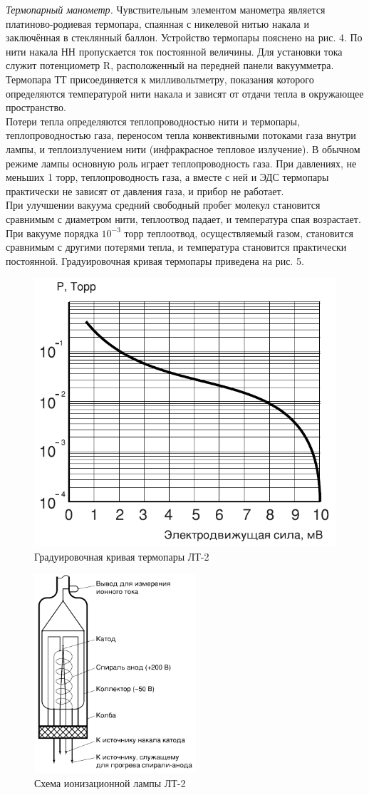 \documentclass[12pt,a4paper]{article}
\begin{document}
 \textit{Термопарный манометр.} Чувствительным элементом манометра является платиново-родиевая термопара, спаянная с никелевой нитью накала и заключённая в стеклянный баллон. Устройство термопары пояснено на рис. 4. По нити накала НН пропускается ток постоянной величины. Для установки тока служит потенциометр R, расположенный на передней панели вакуумметра. Термопара ТТ присоединяется к милливольтметру, показания которого определяются температурой нити накала и зависят от отдачи тепла в окружающее пространство. \\
 Потери тепла определяются теплопроводностью нити и термопары, теплопроводностью газа, переносом тепла конвективными потоками газа внутри лампы, и теплоизлучением нити (инфракрасное тепловое излучение). В обычном режиме лампы основную роль играет теплопроводность газа. При давлениях, не меньших 1 торр, теплопроводность газа, а вместе с ней и ЭДС термопары практически не зависят от давления газа, и прибор не работает. \\
 При улучшении вакуума средний свободный пробег молекул становится сравнимым с диаметром нити, теплоотвод падает, и температура спая возрастает. При вакууме порядка $10^{-3}$ торр теплоотвод, осуществляемый газом, становится сравнимым с другими потерями тепла, и температура становится практически постоянной. Градуировочная кривая термопары приведена на рис. 5. \\
 \begin{figure}[!h]
 	\centering
 	\includegraphics[width=0.4\linewidth]{"кривая.png"}
 	\caption[]{Градуировочная кривая термопары ЛТ-2}
 	\label{fig:Градуировочная кривая}
 \end{figure}
\newpage
 \begin{figure} %
	\begin{center}
		\includegraphics[width=60mm]{"лампа.png"}
		\caption{Схема ионизационной лампы ЛТ-2}
		\label{fig:лампа}
	\end{center}
\end{figure}
\end{document}
